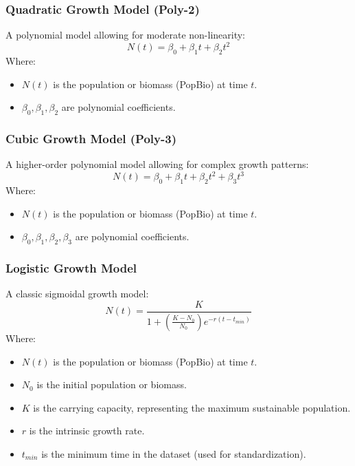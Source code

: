 \documentclass[11pt]{article}
\begin{document}
\subsubsection{Quadratic Growth Model (Poly-2)}
A polynomial model allowing for moderate non-linearity:
\begin{equation}
N(t) = \beta_0 + \beta_1 t + \beta_2 t^2
\end{equation}
Where:
\begin{itemize}
    \item $N(t)$ is the population or biomass (PopBio) at time $t$.
    \item $\beta_0, \beta_1, \beta_2$ are polynomial coefficients.
\end{itemize}

\subsubsection{Cubic Growth Model (Poly-3)}
A higher-order polynomial model allowing for complex growth patterns:
\begin{equation}
N(t) = \beta_0 + \beta_1 t + \beta_2 t^2 + \beta_3 t^3
\end{equation}
Where:
\begin{itemize}
    \item $N(t)$ is the population or biomass (PopBio) at time $t$.
    \item $\beta_0, \beta_1, \beta_2, \beta_3$ are polynomial coefficients.
\end{itemize}

\subsubsection{Logistic Growth Model}
A classic sigmoidal growth model:
\begin{equation}
N(t) = \frac{K}{1 + \left(\frac{K - N_0}{N_0}\right) e^{-r (t - t_{min})}}
\end{equation}
Where:
\begin{itemize}
    \item $N(t)$ is the population or biomass (PopBio) at time $t$.
    \item $N_0$ is the initial population or biomass.
    \item $K$ is the carrying capacity, representing the maximum sustainable population.
    \item $r$ is the intrinsic growth rate.
    \item $t_{min}$ is the minimum time in the dataset (used for standardization).
\end{itemize}
\end{document}
